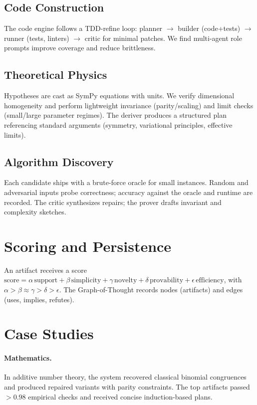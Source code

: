 \documentclass[11pt]{article}
\begin{document}
\subsection{Code Construction}
The code engine follows a TDD-refine loop:
planner $\rightarrow$ builder (code+tests) $\rightarrow$ runner (tests, linters)
$\rightarrow$ critic for minimal patches. We find multi-agent role prompts
improve coverage and reduce brittleness.

\subsection{Theoretical Physics}
Hypotheses are cast as SymPy equations with units.
We verify dimensional homogeneity and perform lightweight invariance (parity/scaling)
and limit checks (small/large parameter regimes). The deriver produces a structured
plan referencing standard arguments (symmetry, variational principles, effective limits).

\subsection{Algorithm Discovery}
Each candidate ships with a brute-force oracle for small instances.
Random and adversarial inputs probe correctness; accuracy against the oracle
and runtime are recorded. The critic synthesizes repairs; the prover drafts
invariant and complexity sketches.

\section{Scoring and Persistence}
An artifact receives a score
$\mathrm{score}=\alpha\,\mathrm{support}+\beta\,\mathrm{simplicity}
+\gamma\,\mathrm{novelty}+\delta\,\mathrm{provability}+\epsilon\,\mathrm{efficiency}$,
with $\alpha>\beta\approx\gamma>\delta>\epsilon$.
The Graph-of-Thought records nodes (artifacts) and edges (uses, implies, refutes).

\section{Case Studies}
\paragraph{Mathematics.}
In additive number theory, the system recovered classical binomial congruences
and produced repaired variants with parity constraints. The top artifacts passed
$>0.98$ empirical checks and received concise induction-based plans.
\end{document}
